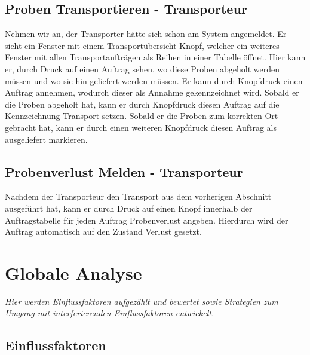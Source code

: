 \documentclass[enabledeprecatedfontcommands,fontsize=12pt,paper=a4,twoside]{scrartcl}
\begin{document}
\subsection{Proben Transportieren - Transporteur}

Nehmen wir an, der Transporter hätte sich schon am System angemeldet. Er sieht ein Fenster mit einem Transportübersicht-Knopf, welcher ein weiteres Fenster mit allen Transportaufträgen als Reihen in einer Tabelle öffnet. Hier kann er, durch Druck auf einen Auftrag sehen, wo diese Proben abgeholt werden müssen und wo sie hin geliefert werden müssen. 
Er kann durch Knopfdruck einen Auftrag annehmen, wodurch dieser als Annahme gekennzeichnet wird. Sobald er die Proben abgeholt hat, kann er durch Knopfdruck diesen Auftrag auf die Kennzeichnung Transport setzen. Sobald er die Proben zum korrekten Ort gebracht hat, kann er durch einen weiteren Knopfdruck diesen Auftrag als ausgeliefert markieren.

\subsection{Probenverlust Melden - Transporteur}

Nachdem der Transporteur den Transport aus dem vorherigen Abschnitt ausgeführt hat, kann er durch Druck auf einen Knopf innerhalb der Auftragstabelle für jeden Auftrag Probenverlust angeben. Hierdurch wird der Auftrag automatisch auf den Zustand Verlust gesetzt.


\section{Globale Analyse}

\label{sec:globale_analyse}

{\it Hier werden Einflussfaktoren aufgezählt und bewertet sowie Strategien
zum Umgang mit interferierenden Einflussfaktoren entwickelt.}

\subsection{Einflussfaktoren}


\end{document}
